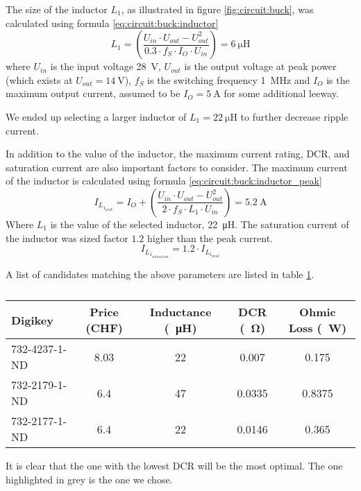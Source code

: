 The size of the inductor $L_1$, as illustrated in figure \ref{fig:circuit:buck},
was calculated using formula \ref{eq:circuit:buck:inductor}
\begin{equation}
    L_1 = \left( \frac{U_{in} \cdot U_{out} - U_{out}^2}{0.3 \cdot f_S \cdot I_O \cdot U_{in}} \right) = \SI{6}{\micro\henry}
    \label{eq:circuit:buck:inductor}
\end{equation}
where $U_{in}$ is the  input  voltage  \SI{28}{\volt},  $U_{out}$  is the output
voltage at peak power (which exists at $U_{out} = \SI{14}{\volt}$), $f_S$ is the
switching frequency \SI{1}{\mega\hertz} and $I_O$ is the maximum output current,
assumed   to   be   $I_O  =  \SI{5}{\ampere}$  for   some   additional   leeway.

We ended up selecting a  larger  inductor  of  $L_1  = \SI{22}{\micro\henry}$ to
further decrease ripple current.

In addition to the value of  the  inductor, the maximum current rating, DCR, and
saturation  current are also important factors to consider. The maximum  current
of the inductor is calculated using formula 
\ref{eq:circuit:buck:inductor_peak}
\begin{equation}
    I_{L_{1_{peak}}} = I_O + \left( \frac{U_{in} \cdot U_{out} - U_{out}^2}{2 \cdot f_S \cdot L_1 \cdot U_{in}} \right) = \SI{5.2}{\ampere}
    \label{eq:circuit:buck:inductor_peak}
\end{equation}
Where $L_1$  is  the  value  of  the selected inductor, \SI{22}{\micro\henry}. The
saturation  current  of the inductor was sized factor $1.2$ higher than the peak
current.
\begin{equation}
    I_{L_{1_{saturation}}} = 1.2 \cdot I_{L_{1_{peak}}}
    \label{eq:circuit:buck:inductor_saturation}
\end{equation}

A  list  of  candidates  matching  the  above  parameters  are  listed in  table
\ref{tab:circuit:buck:inductor}.

\begin{table}[th!]
    \begin{center}
        \caption{}
        \label{tab:circuit:buck:inductor}
        \begin{tabular}{lcccc}
            \toprule
            Digikey         & Price (CHF) & Inductance (\SI{}{\micro\henry}) & DCR (\SI{}{\ohm}) & Ohmic Loss (\SI{}{\watt}) \\
            \midrule
            \rowcolor{lightgray}
            732-4237-1-ND   & 8.03        & 22                               & 0.007             & 0.175  \\
            732-2179-1-ND   & 6.4         & 47                               & 0.0335            & 0.8375 \\
            732-2177-1-ND   & 6.4         & 22                               & 0.0146            & 0.365  \\
            \bottomrule
        \end{tabular}
    \end{center}
\end{table}

It  is  clear that the one with the lowest DCR will be the most optimal. The one
highlighted in grey is the one we chose.

